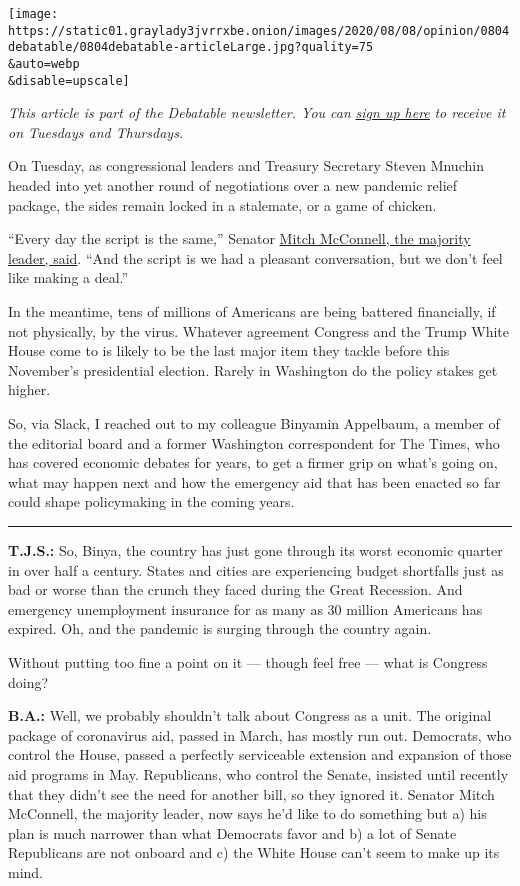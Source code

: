 \texttt{[image: https://static01.graylady3jvrrxbe.onion/images/2020/08/08/opinion/0804debatable/0804debatable-articleLarge.jpg?quality=75\\\&auto=webp\\\&disable=upscale]}

\emph{This article is part of the Debatable newsletter. You can}
\href{https://www.nytimes3xbfgragh.onion/newsletters/debatable}{\emph{sign
up here}} \emph{to receive it on Tuesdays and Thursdays.}

On Tuesday, as congressional leaders and Treasury Secretary Steven
Mnuchin headed into yet another round of negotiations over a new
pandemic relief package, the sides remain locked in a stalemate, or a
game of chicken.

``Every day the script is the same,'' Senator
\href{https://www.bloomberg.com/news/articles/2020-08-04/pelosi-mnuchin-signal-first-halting-progress-on-stimulus-deal}{Mitch
McConnell, the majority leader, said}. ``And the script is we had a
pleasant conversation, but we don't feel like making a deal.''

In the meantime, tens of millions of Americans are being battered
financially, if not physically, by the virus. Whatever agreement
Congress and the Trump White House come to is likely to be the last
major item they tackle before this November's presidential election.
Rarely in Washington do the policy stakes get higher.

So, via Slack, I reached out to my colleague Binyamin Appelbaum, a
member of the editorial board and a former Washington correspondent for
The Times, who has covered economic debates for years, to get a firmer
grip on what's going on, what may happen next and how the emergency aid
that has been enacted so far could shape policymaking in the coming
years.

\begin{center}\rule{0.5\linewidth}{\linethickness}\end{center}

\textbf{T.J.S.:} So, Binya, the country has just gone through its worst
economic quarter in over half a century. States and cities are
experiencing budget shortfalls just as bad or worse than the crunch they
faced during the Great Recession. And emergency unemployment insurance
for as many as 30 million Americans has expired. Oh, and the pandemic is
surging through the country again.

Without putting too fine a point on it --- though feel free --- what is
Congress doing?

\textbf{B.A.:} Well, we probably shouldn't talk about Congress as a
unit. The original package of coronavirus aid, passed in March, has
mostly run out. Democrats, who control the House, passed a perfectly
serviceable extension and expansion of those aid programs in May.
Republicans, who control the Senate, insisted until recently that they
didn't see the need for another bill, so they ignored it. Senator Mitch
McConnell, the majority leader, now says he'd like to do something but
a) his plan is much narrower than what Democrats favor and b) a lot of
Senate Republicans are not onboard and c) the White House can't seem to
make up its mind.

